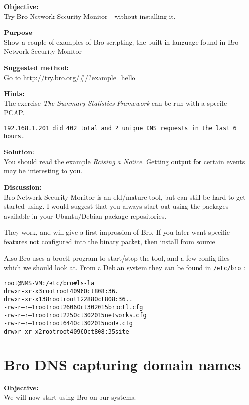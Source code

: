 \documentclass[a4paper,11pt,notitlepage]{report}
\begin{document}
{\bf Objective:} \\
Try Bro Network Security Monitor - without installing it.


{\bf Purpose:}\\
Show a couple of examples of Bro scripting, the built-in language found in Bro Network Security Monitor


{\bf Suggested method:}\\

Go to \url{http://try.bro.org/#/?example=hello}

{\bf Hints:}\\
The exercise
\emph{The Summary Statistics Framework} can be run with a specifc PCAP.

\verb+192.168.1.201 did 402 total and 2 unique DNS requests in the last 6 hours.+

{\bf Solution:}\\
You should read the example \emph{Raising a Notice}. Getting output for certain events may be interesting to you.


{\bf Discussion:}\\
Bro Network Security Monitor is an old/mature tool, but can still be hard to get started using. I would suggest that you always start out using the packages available in your Ubuntu/Debian package repositories.

They work, and will give a first impression of Bro. If you later want specific features not configured into the binary packet, then install from source.

Also Bro uses a broctl program to start/stop the tool, and a few config files which we should look at. From a Debian system they can be found in \verb+/etc/bro+ :

\begin{alltt}
root@NMS-VM:/etc/bro# ls -la
drwxr-xr-x   3 root root  4096 Oct  8 08:36 .
drwxr-xr-x 138 root root 12288 Oct  8 08:36 ..
-rw-r--r--   1 root root  2606 Oct 30  2015 broctl.cfg
-rw-r--r--   1 root root   225 Oct 30  2015 networks.cfg
-rw-r--r--   1 root root   644 Oct 30  2015 node.cfg
drwxr-xr-x   2 root root  4096 Oct  8 08:35 site
\end{alltt}

\chapter{Bro DNS capturing domain names}
\label{ex:brodnsbasic}


{\bf Objective:} \\
We will now start using Bro on our systems.
\end{document}
